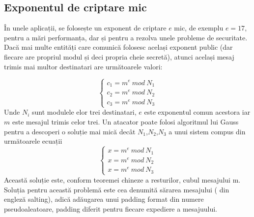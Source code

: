 \documentclass[12pt, oneside]{book}
\begin{document}
\subsection{Exponentul de criptare mic}
În unele aplicații, se folosește un exponent de criptare $e$ mic, de exemplu $e=17$, pentru a mări performanța, dar și pentru a rezolva unele probleme de securitate. Dacă mai multe entități care comunică folosesc același exponent public (dar fiecare are propriul modul și deci propria cheie secretă), atunci același mesaj trimis mai multor destinatari are următoarele valori:

\[
\left\{ 
\begin{array}{c}
c_1 = m^e \ mod \ N_1 \\ 
c_2 = m^e \ mod \ N_2 \\ 
c_3 = m^e \ mod \ N_3
\end{array}
\right. 
\]
Unde $N_i$ sunt modulele elor trei destinatari, $e$ este exponentul  comun acestora iar $m$ este mesajul trimis celor trei. Un atacator poate folosi algoritmul lui Gauss pentru a descoperi o soluție mai mică decât $N_1$,$N_2$,$N_3$ a unui sistem compus din următoarele ecuații
\[
\left\{ 
\begin{array}{c}
x=m^e \ mod \ N_1  \\
x=m^e \ mod \ N_2  \\
x=m^e \ mod \ N_3  
\end{array}
\right. 
\]
Această soluție este, conform teoremei chineze a resturilor, cubul mesajului m. Soluția pentru această problemă este cea denumită sărarea mesajului ( din engleză salting), adică adăugarea unui padding format din numere pseudoaleatoare, padding diferit pentru fiecare expediere a mesajuului.
\end{document}
